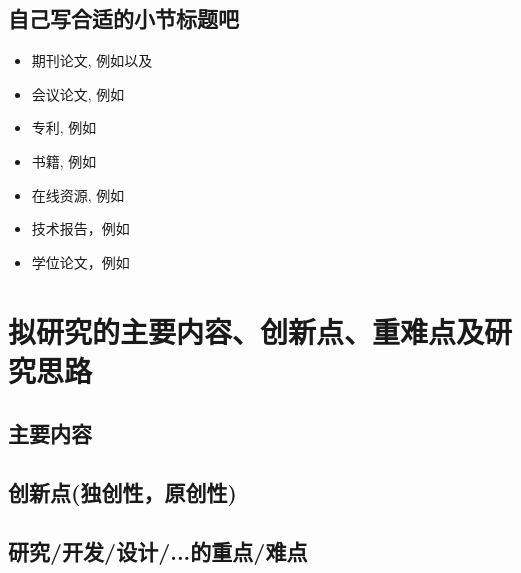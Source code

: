 \documentclass{proposal}
\begin{document}
\zhlipsum[1]

\subsection{自己写合适的小节标题吧}

\zhlipsum[1]

\begin{itemize}
	\item[\ding{172}] 期刊论文, 例如\cite{XmDeng2007,Brown1984,ZHY2017RS,ZHY2012manifold}以及\cite{Wing2006CT}
	\item[\ding{173}] 会议论文, 例如\cite{Geyer1999,Branislav2004}
	\item[\ding{174}] 专利, 例如\cite{LongMA2015P}
	\item[\ding{175}] 书籍, 例如\cite{CDIO2014,ZHY2022}
	\item[\ding{176}] 在线资源, 例如\cite{SFMedu,OpenMVS,HainnuThesis}
	\item[\ding{177}] 技术报告，例如\cite{Sussman2005}
	\item[\ding{178}] 学位论文，例如\cite{ZHY2002,Xue2006,lzj-zhy-MS-thesis-2018,zls-zhy-MS-thesis-2016,zhy-2011-disertation}

\end{itemize}
\ckwx

\SectionEndLine				   %

\section{拟研究的主要内容、创新点、重难点及研究思路}

\subsection{主要内容}

\zhlipsum[2]

\subsection{创新点(独创性，原创性)}

\zhlipsum[1]

\subsection{研究/开发/设计/...的重点/难点}
\end{document}
